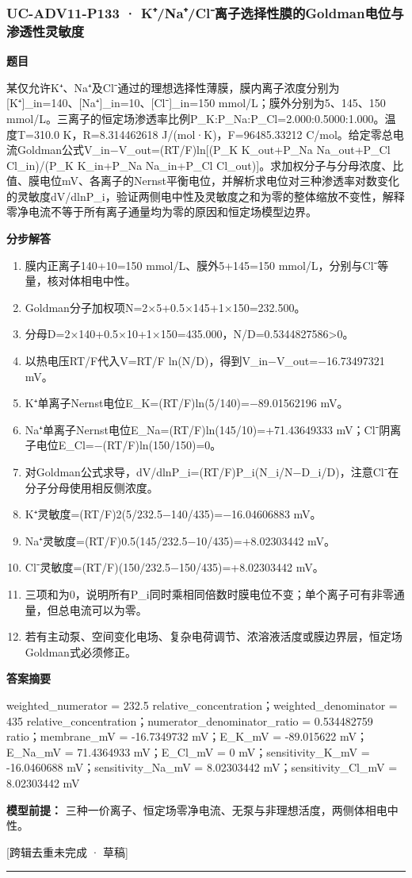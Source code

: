 \documentclass[UTF8,11pt,a4paper]{ctexart}
\begin{document}
\subsubsection*{UC-ADV11-P133 · K⁺/Na⁺/Cl⁻离子选择性膜的Goldman电位与渗透性灵敏度}
\noindent\textbf{题目}\par
某仅允许K⁺、Na⁺及Cl⁻通过的理想选择性薄膜，膜内离子浓度分别为[K⁺]\_in=140、[Na⁺]\_in=10、[Cl⁻]\_in=150 mmol/L；膜外分别为5、145、150 mmol/L。三离子的恒定场渗透率比例P\_K:P\_Na:P\_Cl=2.000:0.5000:1.000。温度T=310.0 K，R=8.314462618 J/(mol·K)，F=96485.33212 C/mol。给定零总电流Goldman公式V\_in−V\_out=(RT/F)ln[(P\_K K\_out+P\_Na Na\_out+P\_Cl Cl\_in)/(P\_K K\_in+P\_Na Na\_in+P\_Cl Cl\_out)]。求加权分子与分母浓度、比值、膜电位mV、各离子的Nernst平衡电位，并解析求电位对三种渗透率对数变化的灵敏度dV/dlnP\_i，验证两侧电中性及灵敏度之和为零的整体缩放不变性，解释零净电流不等于所有离子通量均为零的原因和恒定场模型边界。\par
\medskip\noindent\textbf{分步解答}
\begin{enumerate}
\item 膜内正离子140+10=150 mmol/L、膜外5+145=150 mmol/L，分别与Cl⁻等量，核对体相电中性。
\item Goldman分子加权项N=2×5+0.5×145+1×150=232.500。
\item 分母D=2×140+0.5×10+1×150=435.000，N/D=0.5344827586>0。
\item 以热电压RT/F代入V=RT/F ln(N/D)，得到V\_in−V\_out=−16.73497321 mV。
\item K⁺单离子Nernst电位E\_K=(RT/F)ln(5/140)=−89.01562196 mV。
\item Na⁺单离子Nernst电位E\_Na=(RT/F)ln(145/10)=+71.43649333 mV；Cl⁻阴离子电位E\_Cl=−(RT/F)ln(150/150)=0。
\item 对Goldman公式求导，dV/dlnP\_i=(RT/F)P\_i(N\_i/N−D\_i/D)，注意Cl⁻在分子分母使用相反侧浓度。
\item K⁺灵敏度=(RT/F)2(5/232.5−140/435)=−16.04606883 mV。
\item Na⁺灵敏度=(RT/F)0.5(145/232.5−10/435)=+8.02303442 mV。
\item Cl⁻灵敏度=(RT/F)(150/232.5−150/435)=+8.02303442 mV。
\item 三项和为0，说明所有P\_i同时乘相同倍数时膜电位不变；单个离子可有非零通量，但总电流可以为零。
\item 若有主动泵、空间变化电场、复杂电荷调节、浓溶液活度或膜边界层，恒定场Goldman式必须修正。
\end{enumerate}
\noindent\textbf{答案摘要}\par
weighted\_numerator = 232.5 relative\_concentration；weighted\_denominator = 435 relative\_concentration；numerator\_denominator\_ratio = 0.534482759 ratio；membrane\_mV = -16.7349732 mV；E\_K\_mV = -89.015622 mV；E\_Na\_mV = 71.4364933 mV；E\_Cl\_mV = 0 mV；sensitivity\_K\_mV = -16.0460688 mV；sensitivity\_Na\_mV = 8.02303442 mV；sensitivity\_Cl\_mV = 8.02303442 mV\par
\noindent\textbf{模型前提：}
三种一价离子、恒定场零净电流、无泵与非理想活度，两侧体相电中性。\par
\noindent\textcolor{red!65!black}{[跨辑去重未完成 · 草稿]} \par
\medskip\hrule\medskip
{}
\end{document}
